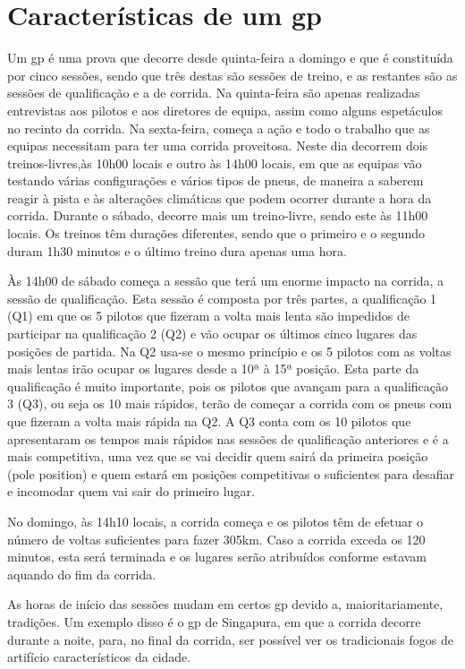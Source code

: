 \documentclass{report}
\begin{document}
\section{Características de um \ac{gp}}
\hspace{\parindent}Um \ac{gp} é uma prova que decorre desde quinta-feira a domingo e que é constituída por cinco sessões, sendo que três destas são sessões de treino, e as restantes são as sessões de qualificação e a de corrida.
Na quinta-feira são apenas realizadas entrevistas aos pilotos e aos diretores de equipa, assim como alguns espetáculos no recinto da corrida. Na sexta-feira, começa a ação e todo o trabalho que as equipas necessitam para ter uma corrida proveitosa. Neste dia decorrem dois treinos-livres,às 10h00 locais e outro às 14h00 locais, em que as equipas vão testando várias configurações e vários tipos de pneus, de maneira a saberem reagir à pista e às alterações climáticas que podem ocorrer durante a hora da corrida. Durante o sábado, decorre mais um treino-livre, sendo este às 11h00 locais. Os treinos têm durações diferentes, sendo que o primeiro e o segundo duram 1h30 minutos e o último treino dura apenas uma hora.

Às 14h00 de sábado começa a sessão que terá um enorme impacto na corrida, a sessão de qualificação. Esta sessão é composta por três partes, a qualificação 1 (Q1) em que os 5 pilotos que fizeram a volta mais lenta são impedidos de participar na qualificação 2 (Q2) e vão ocupar os últimos cinco lugares das posições de partida. Na Q2 usa-se o mesmo princípio e os 5 pilotos com as voltas mais lentas irão ocupar os lugares desde a 10ª à 15ª posição. Esta parte da qualificação é muito importante, pois os pilotos que avançam para a qualificação 3 (Q3), ou seja os 10 mais rápidos, terão de começar a corrida com os pneus com que fizeram a volta mais rápida na Q2. A Q3 conta com os 10 pilotos que apresentaram os tempos mais rápidos nas sessões de qualificação anteriores e é a mais competitiva, uma vez que se vai decidir quem sairá da primeira posição (pole position) e quem estará em posições competitivas o suficientes para desafiar e incomodar quem vai sair do primeiro lugar.

No domingo, às 14h10 locais, a corrida começa e os pilotos têm de efetuar o número de voltas suficientes para fazer 305km. Caso a corrida exceda os 120 minutos, esta será terminada e os lugares serão atribuídos conforme estavam aquando do fim da corrida.

As horas de início das sessões mudam em certos \ac{gp} devido a, maioritariamente, tradições. Um exemplo disso é o \ac{gp} de Singapura, em que a corrida decorre durante a noite, para, no final da corrida, ser possível ver os tradicionais fogos de artifício característicos da cidade. 
\end{document}
